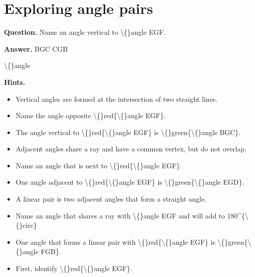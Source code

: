 \documentclass{article}
\begin{document}
\section*{Exploring angle pairs}
\textbf{Question.} Name an angle vertical to \textbackslash\{\}angle EGF.

\textbf{Answer.} BGC
                CGB

                
                    \textbackslash\{\}angle

\textbf{Hints.}
\begin{itemize}
  \item Vertical angles are formed at the intersection of two straight lines.
  \item Name the angle opposite \textbackslash\{\}red\{\textbackslash\{\}angle EGF\}.
  \item The angle vertical to \textbackslash\{\}red\{\textbackslash\{\}angle EGF\} is
                        \textbackslash\{\}green\{\textbackslash\{\}angle BGC\}.
  \item Adjacent angles share a ray and have a common vertex, but do not overlap.
  \item Name an angle that is next to \textbackslash\{\}red\{\textbackslash\{\}angle EGF\}.
  \item One angle adjacent to \textbackslash\{\}red\{\textbackslash\{\}angle EGF\} is
                        \textbackslash\{\}green\{\textbackslash\{\}angle EGD\}.
  \item A linear pair is two adjacent angles that form a straight angle.
  \item Name an angle that shares a ray with \textbackslash\{\}angle EGF
                    and will add to 180\textasciicircum{}\{\textbackslash\{\}circ\}
  \item One angle that forms a linear pair with \textbackslash\{\}red\{\textbackslash\{\}angle EGF\} is
                        \textbackslash\{\}green\{\textbackslash\{\}angle FGB\}.
  \item First, identify \textbackslash\{\}red\{\textbackslash\{\}angle EGF\}.
\end{itemize}
\end{document}
